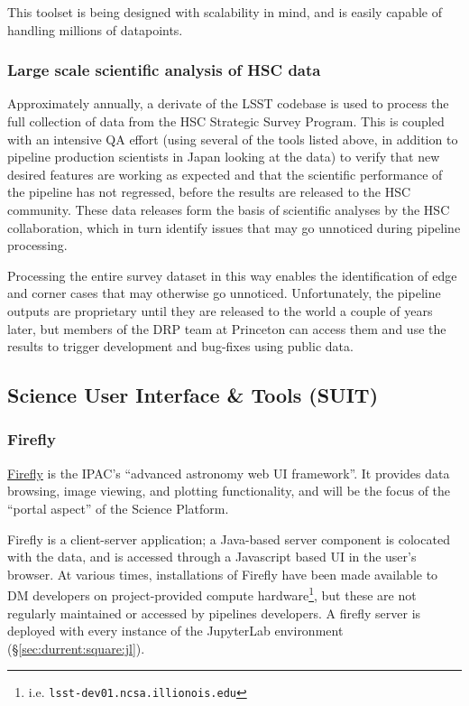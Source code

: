 \documentclass[DM,authoryear,toc,lsstdraft]{lsstdoc}
\begin{document}
This toolset is being designed with scalability in mind, and is easily capable
of handling millions of datapoints.

\subsubsection{Large scale scientific analysis of HSC data}
\label{sec:current:drp:hsc}

Approximately annually, a derivate of the LSST codebase is used to process the
full collection of data from the HSC Strategic Survey Program.  This is
coupled with an intensive QA effort (using several of the tools listed above,
in addition to pipeline production scientists in Japan looking at the data) to
verify that new desired features are working as expected and that the
scientific performance of the pipeline has not regressed, before the results
are released to the HSC community. These data releases form the basis of
scientific analyses by the HSC collaboration, which in turn identify issues
that may go unnoticed during pipeline processing.

Processing the entire survey dataset in this way enables the identification of
edge and corner cases that may otherwise go unnoticed.  Unfortunately, the
pipeline outputs are proprietary until they are released to the world a couple
of years later, but members of the DRP team at Princeton can access them and
use the results to trigger development and bug-fixes using public data.

\subsection{Science User Interface \& Tools (SUIT)}
\label{sec:current:suit}

\subsubsection{Firefly}
\label{sec:current:suit:firefly}

\href{https://github.com/Caltech-IPAC/firefly}{Firefly} is the IPAC's ``advanced
astronomy web UI framework''. It provides data browsing, image viewing, and
plotting functionality, and will be the focus of the ``portal aspect'' of the
Science Platform.

Firefly is a client-server application; a Java-based server component is
colocated with the data, and is accessed through a Javascript based UI in the
user's browser. At various times, installations of Firefly have been made
available to DM developers on project-provided compute hardware\footnote{i.e.
\texttt{lsst-dev01.ncsa.illionois.edu}}, but these are not regularly
maintained or accessed by pipelines developers. A firefly server is deployed
with every instance of the JupyterLab environment (\S\ref{sec:durrent:square:jl}).
\end{document}
